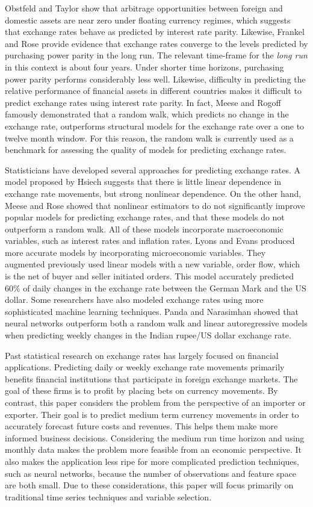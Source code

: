 \documentclass{sig-alternate-05-2015}
\begin{document}
\par{} Obstfeld and Taylor show that arbitrage opportunities between foreign and domestic assets are near zero under floating currency regimes, which suggests that exchange rates behave as predicted by interest rate parity. Likewise, Frankel and Rose provide evidence that exchange rates converge to the levels predicted by purchasing power parity in the long run. The relevant time-frame for the \emph{long run} in this context is about four years. Under shorter time horizons, purchasing power parity performs considerably less well. Likewise, difficulty in predicting the relative performance of financial assets in different countries makes it difficult to predict exchange rates using interest rate parity. In fact, Meese and Rogoff famously demonstrated that a random walk, which predicts no change in the exchange rate, outperforms structural models for the exchange rate over a one to twelve month window. For this reason, the random walk is currently used as a benchmark for assessing the quality of models for predicting exchange rates.
\par{} Statisticians have developed several approaches for predicting exchange rates. A model proposed by Hsiech suggests that there is little linear dependence in exchange rate movements, but strong nonlinear dependence. On the other hand, Meese and Rose showed that nonlinear estimators to do not significantly improve popular models for predicting exchange rates, and that these models do not outperform a random walk. All of these models incorporate macroeconomic variables, such as interest rates and inflation rates. Lyons and Evans produced more accurate models by incorporating microeconomic variables. They augmented previously used linear models with a new variable, order flow, which is the net of buyer and seller initiated orders. This model accurately predicted 60\% of daily changes in the exchange rate between the German Mark and the US dollar. Some researchers have also modeled exchange rates using more sophisticated machine learning techniques. Panda and Narasimhan showed that neural networks outperform both a random walk and linear autoregressive models when predicting weekly changes in the Indian rupee/US dollar exchange rate.
\par{} Past statistical research on exchange rates has largely focused on financial applications. Predicting daily or weekly exchange rate movements primarily benefits financial institutions that participate in foreign exchange markets. The goal of these firms is to profit by placing bets on currency movements. By contrast, this paper considers the problem from the perspective of an importer or exporter. Their goal is to predict medium term currency movements in order to accurately forecast future costs and revenues. This helps them make more informed business decisions. Considering the medium run time horizon and using monthly data makes the problem more feasible from an economic perspective. It also makes the application less ripe for more complicated prediction techniques, such as neural networks, because the number of observations and feature space are both small. Due to these considerations, this paper will focus primarily on traditional time series techniques and variable selection.
\end{document}
